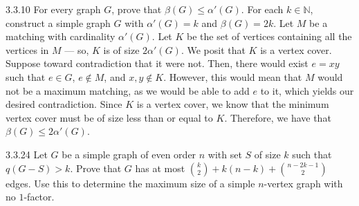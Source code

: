 \documentclass[10pt]{extarticle}
\title{}
\author{Avinash Iyer}
\date{}
\begin{document}
{
  \begin{problem}{3.3.10}
    For every graph $G$, prove that $\beta(G) \leq \alpha'(G)$. For each $k\in \mathbb{N}$, construct a simple graph $G$ with $\alpha'(G) = k$ and $\beta(G) = 2k$.
    \tcblower
    Let $M$ be a matching with cardinality $\alpha'(G)$. Let $K$ be the set of vertices containing all the vertices in $M$ --- so, $K$ is of size $2\alpha'(G)$. We posit that $K$ is a vertex cover. Suppose toward contradiction that it were not. Then, there would exist $e=xy$ such that $e\in G$, $e\notin M$, and $x,y\notin K$. However, this would mean that $M$ would not be a maximum matching, as we would be able to add $e$ to it, which yields our desired contradiction. Since $K$ is a vertex cover, we know that the minimum vertex cover must be of size less than or equal to $K$. Therefore, we have that $\beta(G) \leq 2\alpha'(G)$.
  \end{problem}
  \begin{problem}{3.3.24}
    Let $G$ be a simple graph of even order $n$ with set $S$ of size $k$ such that $q(G-S) > k$. Prove that $G$ has at most ${k\choose 2} + k(n-k) + {n-2k-1 \choose 2}$ edges. Use this to determine the maximum size of a simple $n$-vertex graph with no $1$-factor.
  \end{problem}
}
\end{document}
